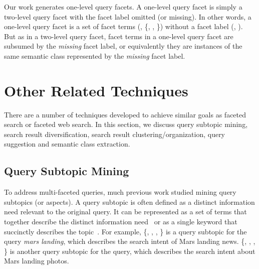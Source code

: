 Our work generates one-level query facets. A one-level query facet is simply a two-level query facet with the facet label omitted (or missing). In other words, a one-level query facet is a set of facet terms (\eg, \{, , \}) without a facet label (\eg, ). But as in a two-level query facet, facet terms in a one-level query facet are subsumed by the \textit{missing} facet label, or equivalently they are instances of the same semantic class represented by the \textit{missing} facet label.

\section{Other Related Techniques}
\label{sec:bg-others}
There are a number of techniques developed to achieve similar goals as faceted search or faceted web search. In this section, we discuss query subtopic mining, search result diversification, search result clustering/organization, query suggestion and semantic class extraction.

\subsection{Query Subtopic Mining}
To address multi-faceted queries, much previous work studied mining query subtopics (or aspects). A query subtopic is often defined as a distinct information need relevant to the original query. It can be represented as a set of terms that together describe the distinct information need~\cite{wang2009mining,wu2011identifying, dang2011inferring} or as a single keyword that succinctly describes the topic~\cite{song2011overview}. For example, \{, , , \} is a query subtopic for the query \textit{mars landing}, which describes the search intent of Mars landing news. \{, , , \} is another query subtopic for the query, which describes the search intent about Mars landing photos.

